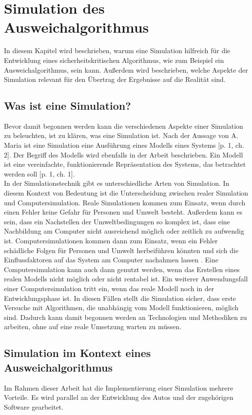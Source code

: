 \section{Simulation des Ausweichalgorithmus}

In diesem Kapitel wird beschrieben, warum eine Simulation hilfreich für die Entwicklung eines 
sicherheitskritischen Algorithmus, wie zum Beispiel ein Ausweichalgorithmus, sein kann.
Außerdem wird beschrieben, welche Aspekte der Simulation relevant für den Übertrag der Ergebnisse auf die Realität sind.

\subsection{Was ist eine Simulation?}
\label{Simulation}
Bevor damit begonnen werden kann die verschiedenen Aspekte einer Simulation zu beleuchten, ist zu klären, was eine Simulation ist.
Nach der Aussage von A. Maria ist eine Simulation eine Ausführung eines Modells eines Systems \cite{maria1997introduction}[p. 1, ch. 2].
Der Begriff des Modells wird ebenfalls in der Arbeit beschrieben. 
Ein Modell ist eine vereinfachte, funktionierende Repräsentation des Systems, das betrachtet werden soll \cite{maria1997introduction}[p. 1, ch. 1].\\
In der Simulationstechnik gibt es unterschiedliche Arten von Simulation. 
In diesem Kontext von Bedeutung ist die Unterscheidung zwischen realer Simulation und Computersimulation. 
Reale Simulationen kommen zum Einsatz, wenn durch einen Fehler keine Gefahr für Personen und Umwelt besteht.
Außerdem kann es sein, dass ein Nachstellen der Umweltbedingungen so komplex ist, dass eine Nachbildung am Computer nicht ausreichend möglich oder zeitlich zu aufwendig ist. 
Computersimulationen kommen dann zum Einsatz, wenn ein Fehler schädliche Folgen für Personen und Umwelt herbeiführen könnten und sich die Einflussfaktoren auf das System am Computer nachahmen lassen \cite{Britannica2023}. 
Eine Computersimulation kann auch dann genutzt werden, wenn das Erstellen eines realen Modells nicht möglich oder nicht rentabel ist. 
Ein weiterer Anwendungsfall einer Computersimulation tritt ein, wenn das reale Modell noch in der Entwicklungsphase ist. 
In diesen Fällen stellt die Simulation sicher, dass erste Versuche mit Algorithmen, die unabhängig vom Modell funktionieren, möglich sind. 
Dadurch kann damit begonnen werden an Technologien und Methodiken zu arbeiten, ohne auf eine reale Umsetzung warten zu müssen.

\subsection{Simulation im Kontext eines Ausweichalgorithmus}
Im Rahmen dieser Arbeit hat die Implementierung einer Simulation mehrere Vorteile. 
Es wird parallel an der Entwicklung des Autos und der zugehörigen Software gearbeitet.

